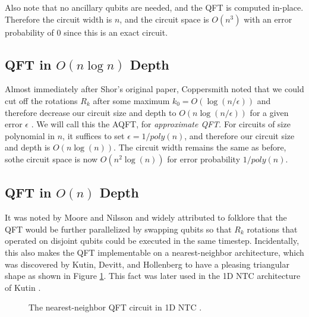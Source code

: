 Also note that no ancillary qubits are needed, and the QFT is computed
in-place. Therefore the circuit width is $n$, and the circuit space is
$O(n^3)$ with an error probability of $0$ since this is an exact circuit.

\subsection{QFT in $O(n\log n)$ Depth}

Almost immediately after Shor's original paper, Coppersmith noted that we
could cut off the rotations $R_k$ after some maximum $k_0 = O(\log(n/\epsilon))$
and therefore decrease
our circuit size and depth to $O(n\log(n/\epsilon))$ for a given
error $\epsilon$ \cite{Coppersmith1994}. We will call this the AQFT,
for \emph{approximate QFT}. For circuits of size polynomial
in $n$, it suffices to set $\epsilon = 1/poly(n)$, and therefore our
circuit size and depth is $O(n\log(n))$. The circuit width remains the same
as before, sothe circuit space is now $O(n^2\log(n))$ for
error probability $1/poly(n)$.


\subsection{QFT in $O(n)$ Depth}

It was noted by Moore and Nilsson \cite{Moore1998} and widely attributed
to folklore that the QFT would be further parallelized by swapping qubits
so that $R_k$ rotations that operated on disjoint qubits could be executed
in the same timestep. Incidentally, this also makes the QFT implementable
on a nearest-neighbor architecture, which was discovered by Kutin, Devitt,
and Hollenberg \cite{Fowler2004} to have a pleasing triangular shape
as shown in Figure \ref{fig:qft-fdh}. This fact was later
used in the 1D NTC
architecture of Kutin \cite{Kutin2006}.

\begin{figure}
\label{fig:qft-fdh}
\caption{The nearest-neighbor QFT circuit in 1D NTC \cite{Fowler2006}.}
\end{figure}

